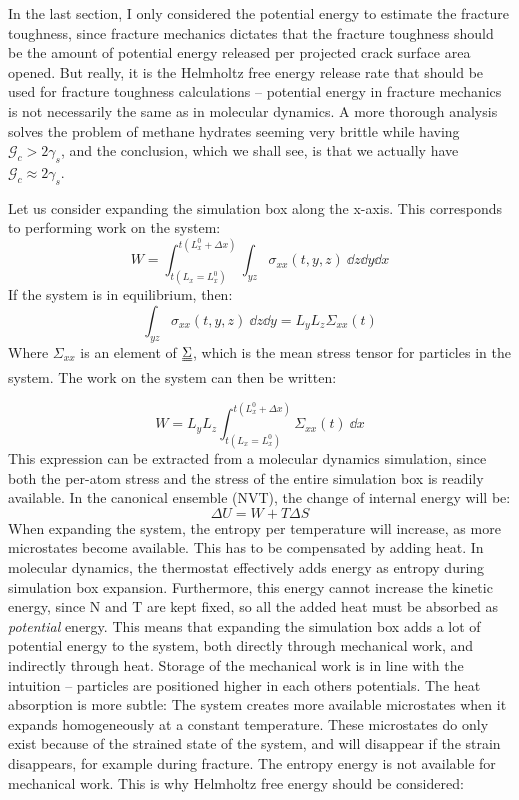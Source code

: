 In the last section, I only considered the potential energy to estimate the fracture toughness, since fracture mechanics dictates that the fracture toughness should be the amount of potential energy released per projected crack surface area opened. But really, it is the Helmholtz free energy release rate that should be used for fracture toughness calculations -- potential energy in fracture mechanics is not necessarily the same as in molecular dynamics. A more thorough analysis solves the problem of methane hydrates seeming very brittle while having $\mathcal{G}_c > 2\gamma_s$, and the conclusion, which we shall see, is that we actually have $\mathcal{G}_c \approx 2\gamma_s$.

Let us consider expanding the simulation box along the x-axis. This corresponds to performing work on the system:
%
\begin{equation}
	W = \int_{t(L_x = L_x^0)}^{t(L_x^0 + \Delta x)} \int_{yz} \sigma_{xx} (t, y, z) \ \dd z \dd y \dd x
\end{equation}
%
If the system is in equilibrium, then:
\begin{equation}
\int_{yz} \sigma_{xx} (t, y, z) \ \dd z \dd y = L_yL_z\Sigma_{xx}(t)	
\end{equation}
Where $\Sigma_{xx}$ is an element of $\uuline \Sigma$, which is the mean stress tensor for particles in the system. The work on the system can then be written:

\begin{equation}
	W = L_y L_z \int_{t(L_x = L_x^0)}^{t(L_x^0 + \Delta x)} \Sigma_{xx}(t) \ \dd x
	\label{eq:work_expansion}
\end{equation}
This expression can be extracted from a molecular dynamics simulation, since both the per-atom stress and the stress of the entire simulation box is readily available.
In the canonical ensemble (NVT), the change of internal energy will be:
\begin{equation}
	\Delta U = W + T\Delta S
\end{equation}
When expanding the system, the entropy per temperature will increase, as more microstates become available. This has to be compensated by adding heat. In molecular dynamics, the thermostat effectively adds energy as entropy during simulation box expansion. Furthermore, this energy cannot increase the kinetic energy, since N and T are kept fixed, so all the added heat must be absorbed as \emph{potential} energy. This means that expanding the simulation box adds a lot of potential energy to the system, both directly through mechanical work, and indirectly through heat. Storage of the mechanical work is in line with the intuition -- particles are positioned higher in each others potentials. The heat absorption is more subtle: The system creates more available microstates when it expands homogeneously at a constant temperature. These microstates do only exist because of the strained state of the system, and will disappear if the strain disappears, for example during fracture. The entropy energy is not available for mechanical work. This is why Helmholtz free energy should be considered:

